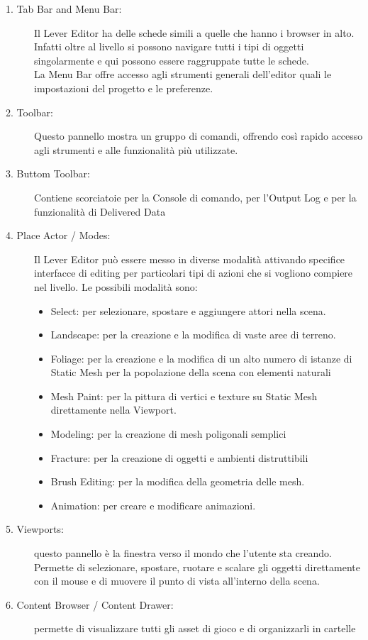 \begin{description}
    \item [1. Tab Bar and Menu Bar:] Il Lever Editor ha delle schede simili a quelle che hanno i browser in alto. Infatti oltre al livello si possono navigare tutti i tipi di oggetti singolarmente e qui possono essere raggruppate tutte le schede. \\ La Menu Bar offre accesso agli strumenti generali dell'editor quali le impostazioni del progetto e le preferenze.
    \item [2. Toolbar:] Questo pannello mostra un gruppo di comandi, offrendo così rapido accesso agli strumenti e alle funzionalità più utilizzate.
    \item [3. Buttom Toolbar:] Contiene scorciatoie per la Console di comando, per l'Output Log e per la funzionalità di Delivered Data 
    \item [4. Place Actor / Modes:] Il Lever Editor può essere messo in diverse modalità attivando specifice interfacce di editing per particolari tipi di azioni che si vogliono compiere nel livello. Le possibili modalità sono:
    \begin{itemize}[-]
        \item Select: per selezionare, spostare e aggiungere attori nella scena.
        \item Landscape: per la creazione e la modifica di vaste aree di terreno.
        \item Foliage: per la creazione e la modifica di un alto numero di istanze di Static Mesh per la popolazione della scena con elementi naturali 
        \item Mesh Paint: per la pittura di vertici e texture su Static Mesh direttamente nella Viewport.
        \item Modeling: per la creazione di mesh poligonali semplici 
        \item Fracture: per la creazione di oggetti e ambienti distruttibili
        \item Brush Editing: per la modifica della geometria delle mesh.
        \item Animation: per creare e modificare animazioni.
    \end{itemize}
    \item [5. Viewports:] questo pannello è la finestra verso il mondo che l'utente sta creando. Permette di selezionare, spostare, ruotare e scalare gli oggetti direttamente con il mouse e di muovere il punto di vista all'interno della scena. 
    \item [6. Content Browser / Content Drawer:] permette di visualizzare tutti gli asset di gioco e di organizzarli in cartelle

\end{description}
